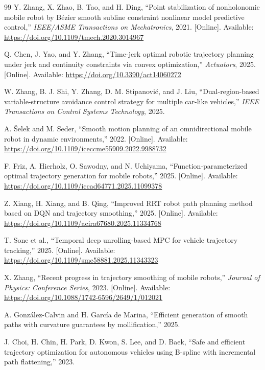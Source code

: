 \begin{thebibliography}{99}
Y. Zhang, X. Zhao, B. Tao, and H. Ding, ``Point stabilization of nonholonomic mobile robot by Bézier smooth subline constraint nonlinear model predictive control,'' \emph{IEEE/ASME Transactions on Mechatronics}, 2021. [Online]. Available: \url{https://doi.org/10.1109/tmech.2020.3014967}

Q. Chen, J. Yao, and Y. Zhang, ``Time-jerk optimal robotic trajectory planning under jerk and continuity constraints via convex optimization,'' \emph{Actuators}, 2025. [Online]. Available: \url{https://doi.org/10.3390/act14060272}

W. Zhang, B. J. Shi, Y. Zhang, D. M. Stipanović, and J. Liu, ``Dual-region-based variable-structure avoidance control strategy for multiple car-like vehicles,'' \emph{IEEE Transactions on Control Systems Technology}, 2025.

A. Šelek and M. Seder, ``Smooth motion planning of an omnidirectional mobile robot in dynamic environments,'' 2022. [Online]. Available: \url{https://doi.org/10.1109/iceccme55909.2022.9988732}

F. Friz, A. Hierholz, O. Sawodny, and N. Uchiyama, ``Function-parameterized optimal trajectory generation for mobile robots,'' 2025. [Online]. Available: \url{https://doi.org/10.1109/iccad64771.2025.11099378}

Z. Xiang, H. Xiang, and B. Qing, ``Improved RRT robot path planning method based on DQN and trajectory smoothing,'' 2025. [Online]. Available: \url{https://doi.org/10.1109/acira67680.2025.11334768}

T. Sone et al., ``Temporal deep unrolling-based MPC for vehicle trajectory tracking,'' 2025. [Online]. Available: \url{https://doi.org/10.1109/smc58881.2025.11343323}

X. Zhang, ``Recent progress in trajectory smoothing of mobile robots,'' \emph{Journal of Physics: Conference Series}, 2023. [Online]. Available: \url{https://doi.org/10.1088/1742-6596/2649/1/012021}

A. González-Calvin and H. García de Marina, ``Efficient generation of smooth paths with curvature guarantees by mollification,'' 2025.

J. Choi, H. Chin, H. Park, D. Kwon, S. Lee, and D. Baek, ``Safe and efficient trajectory optimization for autonomous vehicles using B-spline with incremental path flattening,'' 2023.


\end{thebibliography}
